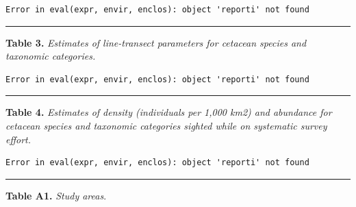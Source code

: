 \documentclass[
]{book}
\newenvironment{Shaded}{\begin{snugshade}}{\end{snugshade}}
\newcommand{\NormalTok}[1]{#1}
\newcommand{\SpecialCharTok}[1]{\textcolor[rgb]{0.81,0.36,0.00}{\textbf{#1}}}
\begin{document}
\begin{Shaded}
\end{Shaded}

\begin{verbatim}
Error in eval(expr, envir, enclos): object 'reporti' not found
\end{verbatim}

\begin{center}\rule{0.5\linewidth}{0.5pt}\end{center}

\textbf{Table 3.} \emph{Estimates of line-transect parameters for cetacean species and taxonomic categories.}

\begin{Shaded}
\end{Shaded}

\begin{verbatim}
Error in eval(expr, envir, enclos): object 'reporti' not found
\end{verbatim}

\begin{center}\rule{0.5\linewidth}{0.5pt}\end{center}

\textbf{Table 4.} \emph{Estimates of density (individuals per 1,000 km2) and abundance for cetacean species and taxonomic categories sighted while on systematic survey effort.}

\begin{Shaded}
\end{Shaded}

\begin{verbatim}
Error in eval(expr, envir, enclos): object 'reporti' not found
\end{verbatim}

\begin{center}\rule{0.5\linewidth}{0.5pt}\end{center}

\textbf{Table A1.} \emph{Study areas}.
\end{document}
